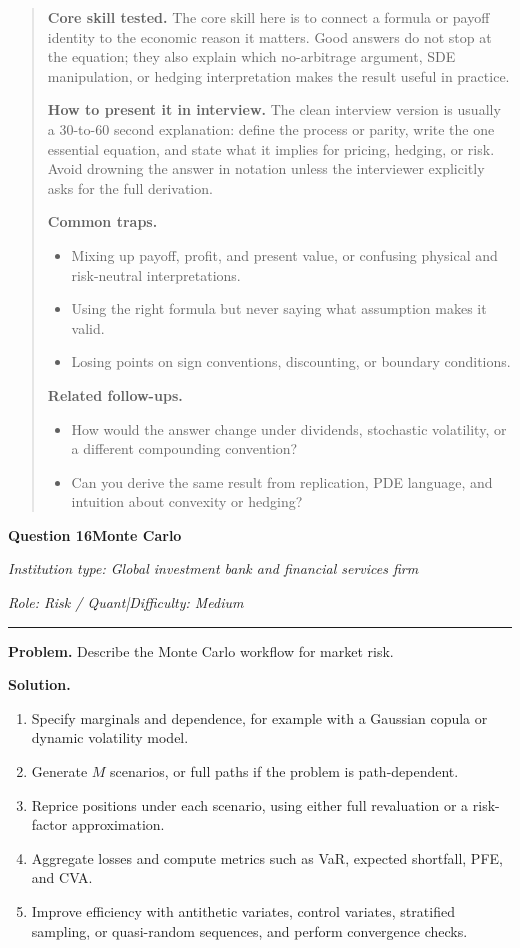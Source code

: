 \documentclass[11pt,letterpaper,openany]{book}
\newenvironment{EditorialNote}
  {\begin{quote}\small\setlength{\parskip}{0.25em}}
  {\end{quote}}
\newcommand{\QuestionSpacer}{\vspace{0.4em}}
\newcommand{\InterviewQuestionHeader}[5]{%
  \vspace{1.0em}%
  {\large\bfseries #1\enspace #4\par}%
  {\small\itshape Institution type: #2\par}%
  {\small\itshape Role: #3\enspace |\enspace Difficulty: #5\par}%
  \vspace{0.25em}\hrule\vspace{0.45em}%
}
\begin{document}
\begin{EditorialNote}


\textbf{Core skill tested.} The core skill here is to connect a formula or payoff identity to the economic reason it matters. Good answers do not stop at the equation; they also explain which no-arbitrage argument, SDE manipulation, or hedging interpretation makes the result useful in practice.

\textbf{How to present it in interview.} The clean interview version is usually a 30-to-60 second explanation: define the process or parity, write the one essential equation, and state what it implies for pricing, hedging, or risk. Avoid drowning the answer in notation unless the interviewer explicitly asks for the full derivation.

\textbf{Common traps.}
\begin{itemize}
\item Mixing up payoff, profit, and present value, or confusing physical and risk-neutral interpretations.
\item Using the right formula but never saying what assumption makes it valid.
\item Losing points on sign conventions, discounting, or boundary conditions.
\end{itemize}

\textbf{Related follow-ups.}
\begin{itemize}
\item How would the answer change under dividends, stochastic volatility, or a different compounding convention?
\item Can you derive the same result from replication, PDE language, and intuition about convexity or hedging?
\end{itemize}


\end{EditorialNote}
\QuestionSpacer

\InterviewQuestionHeader{Question 16}{Global investment bank and financial services firm}{Risk / Quant}{Monte Carlo}{Medium}
\textbf{Problem.} Describe the Monte Carlo workflow for market risk.

\textbf{Solution.}

\begin{enumerate}
\item Specify marginals and dependence, for example with a Gaussian copula or dynamic volatility model.
\item Generate \(M\) scenarios, or full paths if the problem is path-dependent.
\item Reprice positions under each scenario, using either full revaluation or a risk-factor approximation.
\item Aggregate losses and compute metrics such as VaR, expected shortfall, PFE, and CVA.
\item Improve efficiency with antithetic variates, control variates, stratified sampling, or quasi-random sequences, and perform convergence checks.
\end{enumerate}
\end{document}
